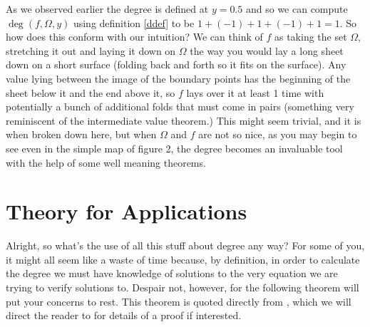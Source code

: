 \documentclass[11pt]{article}
\theoremstyle{plain}
\theoremstyle{definition}
\theoremstyle{remark}
\begin{document}
As we observed earlier the degree is defined at $y=0.5$ and so we can compute $\operatorname{deg}\left(f,\Omega,y\right)$ using definition \ref{ddef} to be $1+(-1)+1+(-1)+1=1$. So how does this conform with our intuition? We can think of $f$ as taking the set $\Omega$, stretching it out and laying it down on $\Omega$ the way you would lay a long sheet down on a short surface (folding back and forth so it fits on the surface). Any value lying between the image of the boundary points has the beginning of the sheet below it and the end above it, so $f$ lays over it at least 1 time with potentially a bunch of additional folds that must come in pairs (something very reminiscent of the intermediate value theorem.)
This might seem trivial, and it is when broken down here, but when $\Omega$ and $f$  are not so nice, as you may begin to see even in the simple map of figure 2, the degree becomes an invaluable tool with the help of some well meaning theorems. 

  


\section{Theory for Applications}

Alright, so what's the use of all this stuff about degree any way? For some of you, it might all seem like a waste of time because, by definition, in order to calculate the degree we must have knowledge of solutions to the very equation we are trying to verify solutions to. Despair not, however, for the following theorem will put your concerns to rest. 
This theorem is quoted directly from \cite{OrChCh2006}, which we will direct the reader to for details of a proof if interested. 
\end{document}

